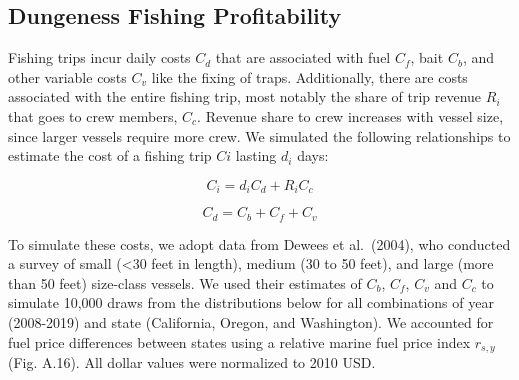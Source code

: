 \documentclass[]{elsarticle} %
\begin{document}
\hypertarget{dungeness-fishing-profitability}{%
\subsection{Dungeness Fishing
Profitability}\label{dungeness-fishing-profitability}}

Fishing trips incur daily costs \(C_d\) that are associated with fuel
\(C_f\), bait \(C_b\), and other variable costs \(C_v\) like the fixing
of traps. Additionally, there are costs associated with the entire
fishing trip, most notably the share of trip revenue \(R_i\) that goes
to crew members, \(C_c\). Revenue share to crew increases with vessel
size, since larger vessels require more crew. We simulated the following
relationships to estimate the cost of a fishing trip \(Ci\) lasting
\(d_i\) days:

\begin{equation}
  C_i = d_iC_d + R_iC_c 
\end{equation}

\begin{equation}
  C_d = C_b + C_f + C_v
\end{equation}

To simulate these costs, we adopt data from Dewees et al.~(2004), who
conducted a survey of small (\textless30 feet in length), medium (30 to
50 feet), and large (more than 50 feet) size-class vessels. We used
their estimates of \(C_b\), \(C_f\), \(C_v\) and \(C_c\) to simulate
10,000 draws from the distributions below for all combinations of year
(2008-2019) and state (California, Oregon, and Washington). We accounted
for fuel price differences between states using a relative marine fuel
price index \(r_{s,y}\) (Fig. A.16). All dollar values were normalized
to 2010 USD.
\end{document}
